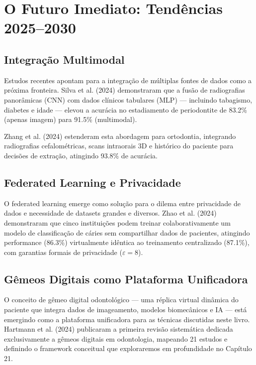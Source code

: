 \section{O Futuro Imediato: Tendências 2025--2030}

\subsection{Integração Multimodal}

Estudos recentes apontam para a integração de múltiplas fontes de dados como a próxima fronteira. Silva et al. (2024) \cite{DL-ODT-029} demonstraram que a fusão de radiografias panorâmicas (CNN) com dados clínicos tabulares (MLP) — incluindo tabagismo, diabetes e idade — elevou a acurácia no estadiamento de periodontite de 83.2\% (apenas imagem) para 91.5\% (multimodal).

Zhang et al. (2024) \cite{DL-ODT-030} estenderam esta abordagem para ortodontia, integrando radiografias cefalométricas, scans intraorais 3D e histórico do paciente para decisões de extração, atingindo 93.8\% de acurácia.

\subsection{Federated Learning e Privacidade}

O federated learning \cite{DL-ODT-032} emerge como solução para o dilema entre privacidade de dados e necessidade de datasets grandes e diversos. Zhao et al. (2024) demonstraram que cinco instituições podem treinar colaborativamente um modelo de classificação de cáries sem compartilhar dados de pacientes, atingindo performance (86.3\%) virtualmente idêntica ao treinamento centralizado (87.1\%), com garantias formais de privacidade ($\varepsilon = 8$).

\subsection{Gêmeos Digitais como Plataforma Unificadora}

O conceito de gêmeo digital odontológico — uma réplica virtual dinâmica do paciente que integra dados de imageamento, modelos biomecânicos e IA — está emergindo como a plataforma unificadora para as técnicas discutidas neste livro. Hartmann et al. (2024) \cite{ODT-044} publicaram a primeira revisão sistemática dedicada exclusivamente a gêmeos digitais em odontologia, mapeando 21 estudos e definindo o framework conceitual que exploraremos em profundidade no Capítulo 21.

